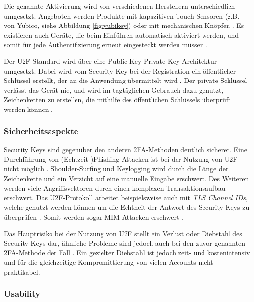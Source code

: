 Die genannte Aktivierung wird von verschiedenen Herstellern unterschiedlich umgesetzt. Angeboten werden Produkte mit kapazitiven Touch-Sensoren (z.B. von Yubico, siehe Abbildung \ref{fig:yubikey}) oder mit mechanischen Knöpfen \parencite{langSecurityKeys2017}. Es existieren auch Geräte, die beim Einführen automatisch aktiviert werden, und somit für jede Authentifizierung erneut eingesteckt werden müssen \parencite{langSecurityKeys2017}.

Der \ac{U2F}-Standard wird über eine Public-Key-Private-Key-Architektur umgesetzt. Dabei wird vom Security Key bei der Registration ein öffentlicher Schlüssel erstellt, der an die Anwendung übermittelt wird \parencite{langSecurityKeys2017}. Der private Schlüssel verlässt das Gerät nie, und wird im tagtäglichen Gebrauch dazu genutzt, Zeichenketten zu erstellen, die mithilfe des öffentlichen Schlüssels überprüft werden können \parencite{reeseUsabilityStudy2019}.

\subsubsection{Sicherheitsaspekte}

Security Keys sind gegenüber den anderen \ac{2FA}-Methoden deutlich sicherer. Eine Durchführung von (Echtzeit-)Phishing-Attacken ist bei der Nutzung von \ac{U2F} nicht möglich \parencite{langSecurityKeys2017}. Shoulder-Surfing und Keylogging wird durch die Länge der Zeichenkette und ein Verzicht auf eine manuelle Eingabe erschwert. Des Weiteren werden viele Angriffsvektoren durch einen komplexen Transaktionsaufbau erschwert. Das \ac{U2F}-Protokoll arbeitet beispielsweise auch mit \textit{TLS Channel IDs}, welche genutzt werden können um die Echtheit der Antwort des Security Keys zu überprüfen \parencite{langSecurityKeys2017}. Somit werden sogar \ac{MIM}-Attacken erschwert \parencite{langSecurityKeys2017}.

Das Hauptrisiko bei der Nutzung von \ac{U2F} stellt ein Verlust oder Diebstahl des Security Keys dar, ähnliche Probleme sind jedoch auch bei den zuvor genannten \ac{2FA}-Methode der Fall \parencite{reeseUsabilityStudy2019}. Ein gezielter Diebstahl ist jedoch zeit- und kostenintensiv und für die gleichzeitige Kompromittierung von vielen Accounts nicht praktikabel.

\subsubsection{Usability}

